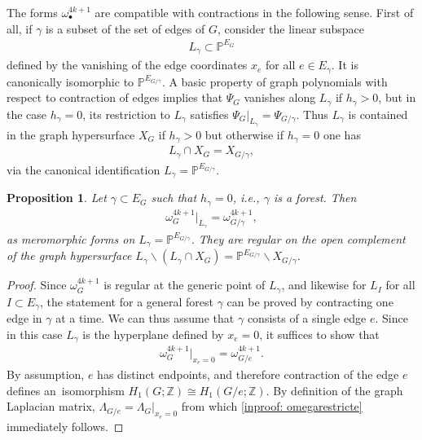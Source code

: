 \documentclass[pdftex]{sigma}%
\newtheorem{prop}[thm]{Proposition}
\numberwithin{equation}{section}
\newcommand{\Z}{\mathbb Z}
\newcommand{\Pro}{\mathbb P}
\newcommand{\0}{\color{blue}{\mathsf{0}}}
\begin{document}
 The forms $\omega_{\bullet}^{4k+1}$ are compatible with contractions in the following sense.
First of all, if $\gamma$ is a subset of the set of edges of $G$, consider the linear subspace
 \begin{gather*}
 L_{\gamma} \subset \Pro^{E_G}
 \end{gather*}
 defined by the vanishing of the edge coordinates $x_e$ for all $ e\in E_{\gamma}$. It is canonically isomorphic to $\Pro^{E_{G/\gamma}}$.
 A basic property of graph polynomials with respect to contraction of edges implies that $\Psi_G$ vanishes along $L_{\gamma}$ if $h_{\gamma}>0$, but in the case $h_{\gamma}=0$, its restriction to $L_{\gamma}$ satisfies $\Psi_G\big|_{L_{\gamma}} = \Psi_{G/\gamma}$. Thus $L_{\gamma}$ is contained in the graph hypersurface $X_{G}$ if $h_{\gamma} >0$ but otherwise if $ h_{\gamma}=0$ one has
 \begin{gather*}
 L_{\gamma} \cap X_G = X_{G/\gamma},
 \end{gather*}
 via the canonical identification $L_{\gamma} = \Pro^{E_{G/\gamma}}$.
\begin{prop} \label{prop: restrictomega} Let $\gamma\subset E_G$ such that $h_{\gamma}=0$, i.e., $\gamma$ is a forest. Then
\begin{gather*}
\omega^{4k+1}_{G} \big|_{L_{\gamma}} = \omega^{4k+1}_{G/\gamma},
\end{gather*}
as meromorphic forms on $L_{\gamma} =\Pro^{E_{G/\gamma}}$. They are regular on the open complement of the graph hypersurface $L_{\gamma} \backslash (L_{\gamma} \cap X_{G}) = \Pro^{E_{G/\gamma}} \backslash X_{G/\gamma}$.
\end{prop}
\begin{proof} Since $\omega_G^{4k+1}$ is regular at the generic point of $L_{\gamma}$, and likewise for $L_I$ for all $I \subset E_{\gamma}$, the statement for a general forest $\gamma$ can be proved by contracting one edge in $\gamma$ at a time. We can thus assume that $\gamma$ consists of a single edge $e$. Since in this case $L_{\gamma} $ is the hyperplane defined by $x_e=0$, it suffices to show that
\begin{gather} \label{inproof: omegarestricte}
\omega^{4k+1}_G \big|_{x_e=0} = \omega^{4k+1}_{G/e}.
\end{gather}
By assumption, $e$ has distinct endpoints, and therefore contraction of the edge $e$ defines an~isomorphism $H_1(G;\Z) \cong H_1(G/e;\Z)$. By definition of the graph Laplacian matrix,
 $\Lambda_{G/e} = \Lambda_{G} \big|_{x_e=0}$ from which \eqref{inproof: omegarestricte} immediately follows.
 \end{proof}
\end{document}
